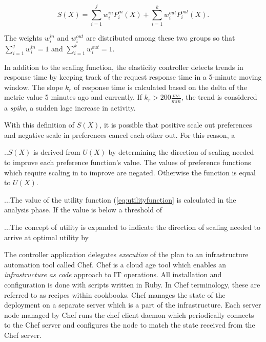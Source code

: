 \documentclass[english]{tktltiki2}
\theoremstyle{definition}
\theoremstyle{remark}
\begin{document}
\begin{equation}
S(X) = \sum\limits_{i=1}^j w_{i}^{in}P_{i}^{in}(X) + 
		\sum\limits_{i=1}^k w_{i}^{out}P_{i}^{out}(X).
\label{eq:scalingfunction}
\end{equation}

The weights $w_{i}^{in}$ and $w_{i}^{out}$ are distributed among these two
groups so that $\sum\limits_{i=1}^j w_{i}^{in} = 1$ and $\sum\limits_{i=1}^k
w_{i}^{out} = 1$.


In addition to the scaling function, the elasticity controller detects trends in
response time by keeping track of the request response time in a 5-minute moving
window. The slope $k_{r}$ of response time is calculated based on the delta of
the metric value 5 minutes ago and currently. If $k_{r} > 200 \frac{ms}{min}$,
the trend is considered a \textit{spike}, a sudden lage increase in activity.


With this definition of $S(X)$, it is possible that positive scale out
preferences and negative scale in preferences cancel each other out. For this
reason, a

..$S(X)$ is derived from $U(X)$ by determining the direction of scaling needed to 
improve each preference function's value. The values of preference functions 
which require scaling in to improve are negated. Otherwise the function is equal 
to $U(X)$. 

...The value of the utility function (\ref{eq:utilityfunction} is calculated in 
the analysis phase. If the value is below a threshold of 

...The concept of utility is expanded to indicate the direction of scaling needed 
to arrive at optimal utility by 

The controller application delegates \textit{execution} of the plan to an
infrastructure automation tool called Chef. Chef is a cloud age tool which
enables an \textit{infrastructure as code} approach to IT operations. All
installation and configuration is done with scripts written in Ruby. In Chef
terminology, these are referred to as recipes within cookbooks. Chef manages the
state of the deployment on a separate server which is a part of the
infrastructure. Each server node managed by Chef runs the chef client daemon
which periodically connects to the Chef server and configures the node to match
the state received from the Chef server.
\end{document}
